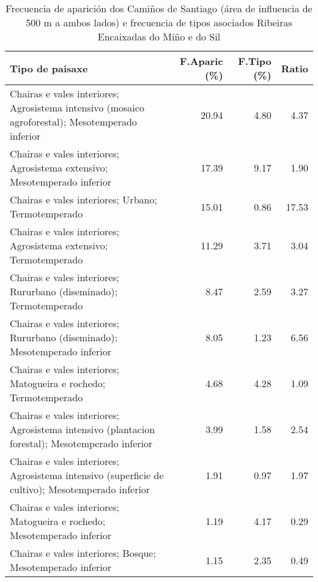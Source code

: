 \begin{table}[p]
\centering
\caption{Frecuencia de aparición dos Camiños de Santiago (área de influencia de 500 m a ambos lados) e frecuencia de tipos asociados Ribeiras Encaixadas do Miño e do Sil} 
\label{vcamino4}
\begin{tabular}{lrrr}
  \hline
Tipo de paisaxe & F.Aparic (\%) & F.Tipo (\%) & Ratio \\ 
  \hline
Chairas e vales interiores; Agrosistema intensivo (mosaico agroforestal); Mesotemperado inferior & 20.94 & 4.80 & 4.37 \\ 
  Chairas e vales interiores; Agrosistema extensivo; Mesotemperado inferior & 17.39 & 9.17 & 1.90 \\ 
  Chairas e vales interiores; Urbano; Termotemperado & 15.01 & 0.86 & 17.53 \\ 
  Chairas e vales interiores; Agrosistema extensivo; Termotemperado & 11.29 & 3.71 & 3.04 \\ 
  Chairas e vales interiores; Rururbano (diseminado); Termotemperado & 8.47 & 2.59 & 3.27 \\ 
  Chairas e vales interiores; Rururbano (diseminado); Mesotemperado inferior & 8.05 & 1.23 & 6.56 \\ 
  Chairas e vales interiores; Matogueira e rochedo; Termotemperado & 4.68 & 4.28 & 1.09 \\ 
  Chairas e vales interiores; Agrosistema intensivo (plantacion forestal); Mesotemperado inferior & 3.99 & 1.58 & 2.54 \\ 
  Chairas e vales interiores; Agrosistema intensivo (superficie de cultivo); Mesotemperado inferior & 1.91 & 0.97 & 1.97 \\ 
  Chairas e vales interiores; Matogueira e rochedo; Mesotemperado inferior & 1.19 & 4.17 & 0.29 \\ 
  Chairas e vales interiores; Bosque; Mesotemperado inferior & 1.15 & 2.35 & 0.49 \\ 
   \hline
\end{tabular}
\end{table}
